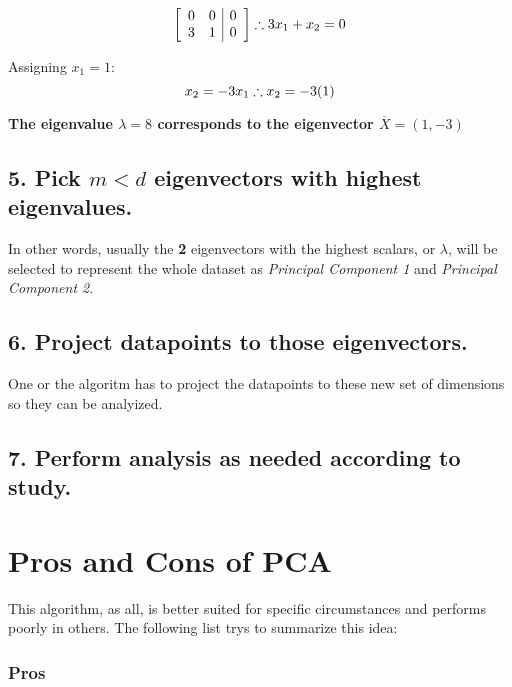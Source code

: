 \documentclass[]{book}
\begin{document}
\[\left[ \begin{array}{cc|r}
0 & 0 & 0\\
3 & 1 & 0 \end{array} \right] \space \therefore 3x_1 + x_2 = 0\]

Assigning \(x_1 = 1\): \[x_2 = -3x_1 \space \therefore x_2 = -3(1)\]

\textbf{The eigenvalue \(\lambda = 8\) corresponds to the eigenvector
\(\overline X = (1,-3)\)}

\subsection{\texorpdfstring{5. Pick \(m<d\) eigenvectors with highest
eigenvalues.}{5. Pick m\textless{}d eigenvectors with highest eigenvalues.}}\label{pick-md-eigenvectors-with-highest-eigenvalues.}

In other words, usually the \textbf{2} eigenvectors with the highest
scalars, or \(\lambda\), will be selected to represent the whole dataset
as \emph{Principal Component 1} and \emph{Principal Component 2}.

\subsection{6. Project datapoints to those
eigenvectors.}\label{project-datapoints-to-those-eigenvectors.}

One or the algoritm has to project the datapoints to these new set of
dimensions so they can be analyized.

\subsection{7. Perform analysis as needed according to
study.}\label{perform-analysis-as-needed-according-to-study.}

\section{Pros and Cons of PCA}\label{pros-and-cons-of-pca}

This algorithm, as all, is better suited for specific circumstances and
performs poorly in others. The following list trys to summarize this
idea:

\subsubsection{\texorpdfstring{\textbf{Pros}}{Pros}}\label{pros}
\end{document}
